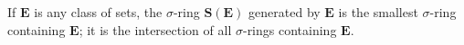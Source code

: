 If $\mathbf{E}$ is any class of sets, the $\sigma$-ring $\mathbf{S}(\mathbf{E})$ generated by $\mathbf{E}$ is the smallest $\sigma$-ring containing $\mathbf{E}$; it is the intersection of all $\sigma$-rings containing $\mathbf{E}$.

